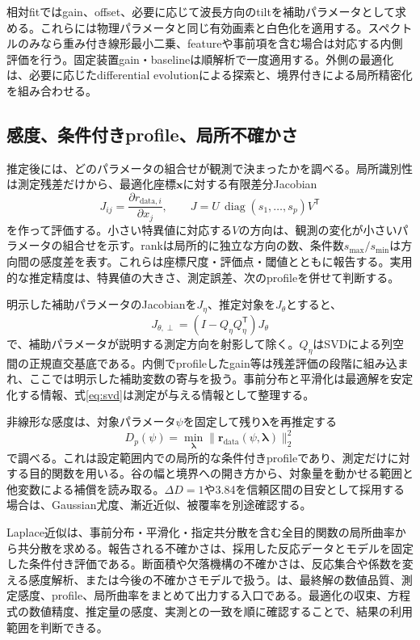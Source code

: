 相対fitではgain、offset、必要に応じて波長方向のtiltを補助パラメータとして求める。これらには物理パラメータと同じ有効画素と白色化を適用する。スペクトルのみなら重み付き線形最小二乗、featureや事前項を含む場合は対応する内側評価を行う。固定装置gain・baselineは順解析で一度適用する。外側の最適化は、必要に応じたdifferential evolutionによる探索と、境界付きによる局所精密化を組み合わせる。

\subsection{感度、条件付きprofile、局所不確かさ}
推定後には、どのパラメータの組合せが観測で決まったかを調べる。局所識別性は測定残差だけから、最適化座標$\boldsymbol x$に対する有限差分Jacobian
\begin{equation}
J_{ij}=\frac{\partial r_{\mathrm{data},i}}{\partial x_j},\qquad
J=U\,\operatorname{diag}(s_1,\ldots,s_p)V^\mathsf T
\label{eq:svd}
\end{equation}
を作って評価する。小さい特異値に対応する$V$の方向は、観測の変化が小さいパラメータの組合せを示す。rankは局所的に独立な方向の数、条件数$s_{\max}/s_{\min}$は方向間の感度差を表す。これらは座標尺度・評価点・閾値とともに報告する。実用的な推定精度は、特異値の大きさ、測定誤差、次のprofileを併せて判断する。

明示した補助パラメータのJacobianを$J_\eta$、推定対象を$J_\theta$とすると、
\begin{equation}
J_{\theta,\perp}=(I-Q_\eta Q_\eta^\mathsf T)J_\theta
\label{eq:project}
\end{equation}
で、補助パラメータが説明する測定方向を射影して除く。$Q_\eta$はSVDによる列空間の正規直交基底である。内側でprofileしたgain等は残差評価の段階に組み込まれ、ここでは明示した補助変数の寄与を扱う。事前分布と平滑化は最適解を安定化する情報、式\eqref{eq:svd}は測定が与える情報として整理する。

非線形な感度は、対象パラメータ$\psi$を固定して残り$\boldsymbol\lambda$を再推定する
\begin{equation}
D_p(\psi)=\min_{\boldsymbol\lambda}\|\boldsymbol r_{\mathrm{data}}(\psi,\boldsymbol\lambda)\|_2^2
\label{eq:profile}
\end{equation}
で調べる。これは設定範囲内での局所的な条件付きprofileであり、測定だけに対する目的関数を用いる。谷の幅と境界への開き方から、対象量を動かせる範囲と他変数による補償を読み取る。$\Delta D=1$や3.84を信頼区間の目安として採用する場合は、Gaussian尤度、漸近近似、被覆率を別途確認する。

Laplace近似は、事前分布・平滑化・指定共分散を含む全目的関数の局所曲率から共分散を求める。報告される不確かさは、採用した反応データとモデルを固定した条件付き評価である。断面積や欠落機構の不確かさは、反応集合や係数を変える感度解析、または今後の不確かさモデルで扱う。は、最終解の数値品質、測定感度、profile、局所曲率をまとめて出力する入口である。最適化の収束、方程式の数値精度、推定量の感度、実測との一致を順に確認することで、結果の利用範囲を判断できる。
